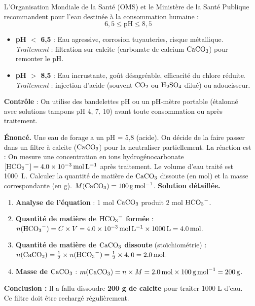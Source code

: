 \documentclass[11pt]{article}
\begin{document}
\begin{exemplebox}
L'Organisation Mondiale de la Santé (OMS) et le Ministère de la Santé Publique recommandent pour l'eau destinée à la consommation humaine :
\[
\boxed{6,5 \le \text{pH} \le 8,5}
\]
\begin{itemize}
    \item \textbf{pH $<$ 6,5} : Eau agressive, corrosion tuyauteries, risque métallique. \emph{Traitement} : filtration sur calcite (carbonate de calcium $\ce{CaCO3}$) pour remonter le pH.
    \item \textbf{pH $>$ 8,5} : Eau incrustante, goût désagréable, efficacité du chlore réduite. \emph{Traitement} : injection d'acide (souvent $\ce{CO2}$ ou $\ce{H2SO4}$ dilué) ou adoucisseur.
\end{itemize}
\textbf{Contrôle} : On utilise des bandelettes pH ou un pH-mètre portable (étalonné avec solutions tampons pH 4, 7, 10) avant toute consommation ou après traitement.
\end{exemplebox}

\begin{exoresolu}
\textbf{Énoncé.} Une eau de forage a un pH = 5,8 (acide). On décide de la faire passer dans un filtre à calcite ($\ce{CaCO3}$) pour la neutraliser partiellement. La réaction est :
On mesure une concentration en ions hydrogénocarbonate $[\ce{HCO3-}] = \SI{4,0e-3}{mol.L^{-1}}$ après traitement. Le volume d'eau traité est \SI{1000}{L}. Calculer la quantité de matière de $\ce{CaCO3}$ dissoute (en mol) et la masse correspondante (en g). $M(\ce{CaCO3}) = \SI{100}{g.mol^{-1}}$.
\tcblower
\textbf{Solution détaillée.}
\begin{enumerate}
    \item \textbf{Analyse de l'équation} : 1 mol $\ce{CaCO3}$ produit 2 mol $\ce{HCO3-}$.
    \item \textbf{Quantité de matière de $\ce{HCO3-}$ formée} :
    $n(\ce{HCO3-}) = C \times V = \SI{4,0e-3}{mol.L^{-1}} \times \SI{1000}{L} = \SI{4,0}{mol}$.
    \item \textbf{Quantité de matière de $\ce{CaCO3}$ dissoute} (stoïchiométrie) :
    $n(\ce{CaCO3}) = \frac{1}{2} \times n(\ce{HCO3-}) = \frac{1}{2} \times 4,0 = \SI{2,0}{mol}$.
    \item \textbf{Masse de $\ce{CaCO3}$} :
    $m(\ce{CaCO3}) = n \times M = \SI{2,0}{mol} \times \SI{100}{g.mol^{-1}} = \SI{200}{g}$.
\end{enumerate}
\textbf{Conclusion :} Il a fallu dissoudre \textbf{200 g de calcite} pour traiter 1000 L d'eau. Ce filtre doit être rechargé régulièrement.
\end{exoresolu}
\end{document}
